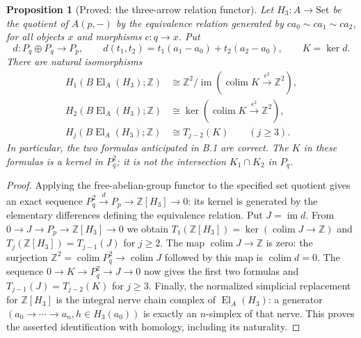 \documentclass[11pt,a4paper]{article}
\newtheorem{proposition}[theorem]{Proposition}
\theoremstyle{definition}
\begin{document}
\begin{proposition}[Proved: the three-arrow relation functor]\label{B:H3}
Let $H_3:A\to\mathrm{Set}$ be the quotient of $A(p,-)$ by the equivalence
relation generated by $ca_0\sim ca_1\sim ca_2$, for all objects $x$ and
morphisms $c:q\to x$.  Put
\[
 d:P_q\oplus P_q\longrightarrow P_p,
 \qquad d(t_1,t_2)=t_1(a_1-a_0)+t_2(a_2-a_0),\qquad K=\ker d.
\]
There are natural isomorphisms
\begin{align*}
 H_1(B\operatorname{El}_A(H_3);\mathbb Z)
   &\cong\mathbb Z^2/\operatorname{im}
       (\operatorname{colim}K\xrightarrow{\epsilon^2}\mathbb Z^2),\\
 H_2(B\operatorname{El}_A(H_3);\mathbb Z)
   &\cong\ker(\operatorname{colim}K\xrightarrow{\epsilon^2}\mathbb Z^2),\\
 H_j(B\operatorname{El}_A(H_3);\mathbb Z)
   &\cong T_{j-2}(K)\qquad(j\geq3).
\end{align*}
In particular, the two formulas anticipated in B.1 are correct.  The
$K$ in these formulas is a kernel in $P_q^2$; it is not the intersection
$K_1\cap K_2$ in $P_q$.
\end{proposition}
\begin{proof}
Applying the free-abelian-group functor to the specified set quotient
gives an exact sequence
$P_q^2\xrightarrow{d}P_p\to\mathbb Z[H_3]\to0$:
its kernel is generated by the elementary differences defining the
equivalence relation.  Put $J=\operatorname{im}d$.  From
$0\to J\to P_p\to\mathbb Z[H_3]\to0$ we obtain
$T_1(\mathbb Z[H_3])=\ker(\operatorname{colim}J\to\mathbb Z)$ and
$T_j(\mathbb Z[H_3])=T_{j-1}(J)$ for $j\geq2$.
The map $\operatorname{colim}J\to\mathbb Z$ is zero: the surjection
$\mathbb Z^2=\operatorname{colim}P_q^2\to\operatorname{colim}J$
followed by this map is $\operatorname{colim}d=0$.  The sequence
$0\to K\to P_q^2\to J\to0$ now gives the first two formulas and
$T_{j-1}(J)=T_{j-2}(K)$ for $j\geq3$.
Finally, the normalized simplicial replacement for $\mathbb Z[H_3]$
is the integral nerve chain complex of $\operatorname{El}_A(H_3)$:
a generator $(a_0\to\cdots\to a_n,h\in H_3(a_0))$ is exactly an
$n$-simplex of that nerve.  This proves the asserted identification with
homology, including its naturality.
\end{proof}
\end{document}
